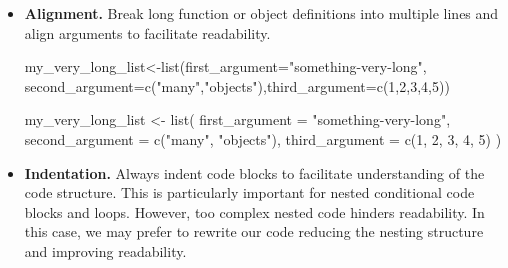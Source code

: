 \documentclass[
  11pt,
]{book}
\newenvironment{Shaded}{\begin{snugshade}}{\end{snugshade}}
\newcommand{\AttributeTok}[1]{\textcolor[rgb]{0.77,0.63,0.00}{#1}}
\newcommand{\DecValTok}[1]{\textcolor[rgb]{0.00,0.00,0.81}{#1}}
\newcommand{\FunctionTok}[1]{\textcolor[rgb]{0.00,0.00,0.00}{#1}}
\newcommand{\NormalTok}[1]{#1}
\newcommand{\OtherTok}[1]{\textcolor[rgb]{0.56,0.35,0.01}{#1}}
\newcommand{\StringTok}[1]{\textcolor[rgb]{0.31,0.60,0.02}{#1}}
\newenvironment{code-tex-bad}
  {\begingroup\definecolor{shadecolor}{RGB}{255, 189, 185}}
  {\endgroup}
\newenvironment{code-tex-good}
  {\begingroup\definecolor{shadecolor}{RGB}{224, 240, 227}}
  {\endgroup}
\begin{document}
\begin{itemize}
\begin{code-tex-good}
  \end{code-tex-good}
\item
  \textbf{Alignment.} Break long function or object definitions into multiple lines and align arguments to facilitate readability.

  \begin{code-tex-bad}

\begin{Shaded}
\begin{Highlighting}[]
\NormalTok{my\_very\_long\_list}\OtherTok{\textless{}{-}}\FunctionTok{list}\NormalTok{(}\AttributeTok{first\_argument=}\StringTok{"something{-}very{-}long"}\NormalTok{,}
\AttributeTok{second\_argument=}\FunctionTok{c}\NormalTok{(}\StringTok{"many"}\NormalTok{,}\StringTok{"objects"}\NormalTok{),}\AttributeTok{third\_argument=}\FunctionTok{c}\NormalTok{(}\DecValTok{1}\NormalTok{,}\DecValTok{2}\NormalTok{,}\DecValTok{3}\NormalTok{,}\DecValTok{4}\NormalTok{,}\DecValTok{5}\NormalTok{))}
\end{Highlighting}
\end{Shaded}

  \end{code-tex-bad}

  \begin{code-tex-good}

\begin{Shaded}
\begin{Highlighting}[]
\NormalTok{my\_very\_long\_list }\OtherTok{\textless{}{-}} \FunctionTok{list}\NormalTok{(}
  \AttributeTok{first\_argument =} \StringTok{"something{-}very{-}long"}\NormalTok{,}
  \AttributeTok{second\_argument =} \FunctionTok{c}\NormalTok{(}\StringTok{"many"}\NormalTok{, }\StringTok{"objects"}\NormalTok{),}
  \AttributeTok{third\_argument =} \FunctionTok{c}\NormalTok{(}\DecValTok{1}\NormalTok{, }\DecValTok{2}\NormalTok{, }\DecValTok{3}\NormalTok{, }\DecValTok{4}\NormalTok{, }\DecValTok{5}\NormalTok{)}
\NormalTok{  )}
\end{Highlighting}
\end{Shaded}

  \end{code-tex-good}
\item
  \textbf{Indentation.} Always indent code blocks to facilitate understanding of the code structure. This is particularly important for nested conditional code blocks and loops. However, too complex nested code hinders readability. In this case, we may prefer to rewrite our code reducing the nesting structure and improving readability.


\end{itemize}
\end{document}
